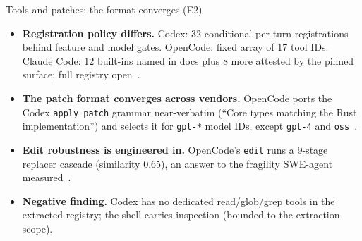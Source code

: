 \documentclass[aspectratio=169,11pt]{beamer}
\newcommand{\codex}[0]{Codex}
\newcommand{\occ}[0]{OpenCode}
\newcommand{\ccc}[0]{Claude Code}
\begin{document}
\begin{frame}{Tools and patches: the format converges (E2)}
  \begin{itemize}
    \item \textbf{Registration policy differs.} \codex{}: 32 conditional
      per-turn registrations behind feature and model gates. \occ{}:
      fixed array of 17 tool IDs. \ccc{}: 12 built-ins named in docs plus
      8 more attested by the pinned surface; full registry open~\citep{codexRepo,opencodeRepo,claudeCodeDocsHooks,claudeCodePluginSurface}.
    \item \textbf{The patch format converges across vendors.} \occ{}
      ports the \codex{} \texttt{apply\_patch} grammar near-verbatim
      (``Core types matching the Rust implementation'') and selects it for
      \texttt{gpt-*} model IDs, except \texttt{gpt-4} and
      \texttt{oss}~\citep{opencodeRepo}.
    \item \textbf{Edit robustness is engineered in.} \occ{}'s
      \texttt{edit} runs a 9-stage replacer cascade (similarity 0.65),
      an answer to the fragility SWE-agent measured~\citep{yang2024sweagent}.
    \item \textbf{Negative finding.} \codex{} has no dedicated
      read/glob/grep tools in the extracted registry; the shell carries
      inspection (bounded to the extraction scope).
  \end{itemize}
\end{frame}
\end{document}
